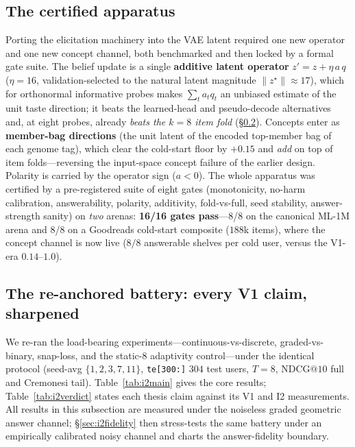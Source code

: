 \documentclass[11pt]{article}
\begin{document}
\subsection{The certified apparatus}\label{sec:i2apparatus}
Porting the elicitation machinery into the VAE latent required one new operator and one new concept channel, both
benchmarked and then locked by a formal gate suite. The belief update is a single \textbf{additive latent operator}
$z' = z + \eta\, a\, q$ ($\eta{=}16$, validation-selected to the natural latent magnitude $\|z^\star\|\approx17$), which
for orthonormal informative probes makes $\sum_t a_t q_t$ an unbiased estimate of the unit taste direction; it beats the
learned-head and pseudo-decode alternatives and, at eight probes, already \emph{beats the $k{=}8$ item fold}
(\S\ref{sec:i2battery}). Concepts enter as \textbf{member-bag directions} (the unit latent of the encoded top-member bag
of each genome tag), which clear the cold-start floor by $+0.15$ and \emph{add} on top of item folds---reversing the
input-space concept failure of the earlier design. Polarity is carried by the operator sign ($a{<}0$). The whole
apparatus was certified by a pre-registered suite of eight gates (monotonicity, no-harm calibration, answerability,
polarity, additivity, fold-vs-full, seed stability, answer-strength sanity) on \emph{two} arenas: \textbf{16/16 gates
pass}---8/8 on the canonical ML-1M arena and 8/8 on a Goodreads cold-start composite ($188$k items), where the concept
channel is now live ($8/8$ answerable shelves per cold user, versus the V1-era $0.14$--$1.0$).

\subsection{The re-anchored battery: every V1 claim, sharpened}\label{sec:i2battery}
We re-ran the load-bearing experiments---continuous-vs-discrete, graded-vs-binary, snap-loss, and the static-8 adaptivity
control---under the identical protocol (seed-avg $\{1,2,3,7,11\}$, \texttt{te[300:]} $304$ test users, $T{=}8$,
$\mathrm{NDCG@10}$ full and Cremonesi tail). Table~\ref{tab:i2main} gives the core results; Table~\ref{tab:i2verdict}
states each thesis claim against its V1 and I2 measurements. All results in this subsection are measured under the
noiseless graded geometric answer channel; \S\ref{sec:i2fidelity} then stress-tests the same battery under an empirically
calibrated noisy channel and charts the answer-fidelity boundary.
\end{document}
